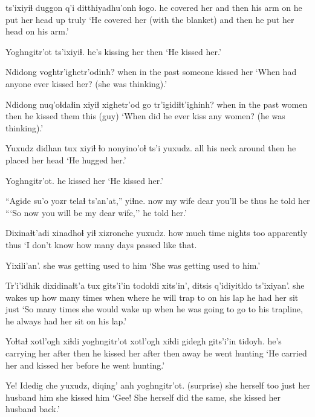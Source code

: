 \documentclass[12pt]{article}
\begin{document}
 ts'ixiyiɬ duggon  q'i ditthiyadhu'onh  ɬogo.
{he covered her}   {and then}  {his arm} on {he put her head up} truly
\glt `He covered her (with the blanket) and then he put her head on his arm.'
\glend

\gll Yoghngitr'ot      ts'ixiyiɬ.
{he's kissing her} then
\glt `He kissed her.' 
\glend

\gll Ndidong          voghtr'ighetr'odinh?
{when in the past} {someone kissed her}
\glt `When had anyone ever kissed her? (she was thinking).'
\glend

\gll Ndidong          nuq'oɬdaɬin xiyiɬ xighetr'od     go   tr'igidiɬt'ighinh?
{when in the past} women       then  {he kissed them} this (guy)
\glt `When did he ever kiss any women? (he was thinking).'
\glend

\gll Yuxudz didhan   tux    xiyiɬ ɬo nonyino'oɬ         ts'i yuxudz.
all    {his neck} around then   {}  {he placed her head}
\glt `He hugged her.'
\glend

\gll Yoghngitr'ot.
{{he kissed her}}
\glt `He kissed her.'
\glend

\gll ``Agide su'o    yozr telaɬ     ts'an'at,'' yiɬne.
now   {my wife} dear {you'll be} {thus} {he told her}
\glt ```So now you will be my dear wife,'' he told her.'
\glend

\gll Dixinaɬt'adi    xinadhoɬ yiɬ xizronche yuxudz.
{how much time} nights   too apparently thus       
\glt `I don't know how many days passed like that.
\glend

\gll Yixili'an'.
{{she was getting used to him}}
\glt `She was getting used to him.'
\glend

\gll Tr'i'idhik   dixidinaɬt'a tux {gits'i'in todoɬdi}  xits'in', ditsis q'idiyitldo    ts'ixiyan'.
{she wakes up} {how many times} when  {where he will trap} to  {on his lap}  {he had her sit } just
\glt `So many times she would wake up when he was going to go to his trapline, he always had her sit on his lap.'
\glend

\gll Yoɬtaɬ         xotl'ogh xiɬdi yoghngitr'ot            xotl'ogh xiɬdi gidegh {gits'i'in tidoyh.}
{he's carrying her} after   then {he kissed her} after then  away    {he went hunting}
\glt `He carried her and kissed her before he went hunting.'
\glend

\gll Ye! Idedig  che yuxudz, diqing'  anh yoghngitr'ot.
(surprise) {she herself} too just {her husband} him {she kissed him}
\glt `Gee! She herself did the same, she kissed her husband back.'
\glend
\end{document}
